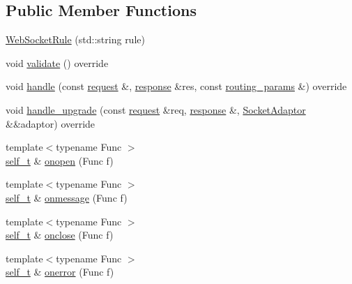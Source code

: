 \subsection*{Public Member Functions}
\begin{DoxyCompactItemize}
\item 
\hyperlink{classcrow_1_1_web_socket_rule_a06deaa752206ca131e28b9b4cbb025ab}{Web\-Socket\-Rule} (std\-::string rule)
\item 
void \hyperlink{classcrow_1_1_web_socket_rule_a516f498b440273f183e2af266092469c}{validate} () override
\item 
void \hyperlink{classcrow_1_1_web_socket_rule_a685d7cce7873eb389114df18f7f2c416}{handle} (const \hyperlink{structcrow_1_1request}{request} \&, \hyperlink{structcrow_1_1response}{response} \&res, const \hyperlink{structcrow_1_1routing__params}{routing\-\_\-params} \&) override
\item 
void \hyperlink{classcrow_1_1_web_socket_rule_ae8f210dcc1c8e8a309ce24d97d549445}{handle\-\_\-upgrade} (const \hyperlink{structcrow_1_1request}{request} \&req, \hyperlink{structcrow_1_1response}{response} \&, \hyperlink{structcrow_1_1_socket_adaptor}{Socket\-Adaptor} \&\&adaptor) override
\item 
{\footnotesize template$<$typename Func $>$ }\\\hyperlink{classcrow_1_1_web_socket_rule}{self\-\_\-t} \& \hyperlink{classcrow_1_1_web_socket_rule_a8a37c7e29ef137b02cb2d48af5241bad}{onopen} (Func f)
\item 
{\footnotesize template$<$typename Func $>$ }\\\hyperlink{classcrow_1_1_web_socket_rule}{self\-\_\-t} \& \hyperlink{classcrow_1_1_web_socket_rule_ab74486cbe36cb5e6f70362998e55b0e0}{onmessage} (Func f)
\item 
{\footnotesize template$<$typename Func $>$ }\\\hyperlink{classcrow_1_1_web_socket_rule}{self\-\_\-t} \& \hyperlink{classcrow_1_1_web_socket_rule_abdca486bb9ef580878510ed8359741c2}{onclose} (Func f)
\item 
{\footnotesize template$<$typename Func $>$ }\\\hyperlink{classcrow_1_1_web_socket_rule}{self\-\_\-t} \& \hyperlink{classcrow_1_1_web_socket_rule_ae1d0168e7fcee3664b672d1a346ba54d}{onerror} (Func f)
\end{DoxyCompactItemize}

